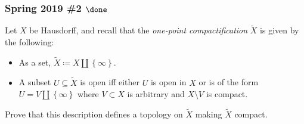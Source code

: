\hypertarget{spring-2019-2-done}{%
\subsubsection{\texorpdfstring{Spring 2019 \#2
\(\done\)}{Spring 2019 \#2 \textbackslash done}}\label{spring-2019-2-done}}

\begin{problem}[?]

Let \(X\) be Hausdorff, and recall that the \emph{one-point
compactification} \(\tilde X\) is given by the following:

\begin{itemize}
\item
  As a set, \(\tilde X \coloneqq X{\coprod}\left\{{\infty}\right\}\).
\item
  A subset \(U\subseteq \tilde X\) is open iff either \(U\) is open in
  \(X\) or is of the form \(U = V{\coprod}\left\{{\infty}\right\}\)
  where \(V\subset X\) is arbitrary and \(X\setminus V\) is compact.
\end{itemize}

Prove that this description defines a topology on \(\tilde X\) making
\(\tilde X\) compact.

\end{problem}

